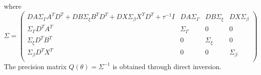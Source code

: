 \documentclass[ba]{imsart}
\begin{document}
where
\begin{equation*}
\Sigma = \begin{pmatrix}
DA\Sigma_{\Gamma}A^{T}D^{T} + DB\Sigma_{\xi}B^{T}D^{T} + DX\Sigma_{\beta}X^{T}D^{T} + \tau^{-1}I & DA\Sigma_{\Gamma} & DB\Sigma_{\xi} & DX\Sigma_{\beta} \\
\Sigma_{\Gamma}D^{T}A^{T} & \Sigma_{\Gamma} & 0 & 0 \\
\Sigma_{\xi}D^{T}B^{T} & 0 & \Sigma_{\xi} & 0 \\
\Sigma_{\beta}D^{T}X^{T} & 0 & 0 & \Sigma_{\beta} \\
\end{pmatrix}
\end{equation*}
The precision matrix $Q(\theta) = \Sigma^{-1}$ is obtained through direct inversion.


\nocite{*}%

%

\clearpage

\begin{table}
\begin{center}
\end{center}
\caption{Comparision metrics from 300 aggregations, for the first simulation study in section \ref{subsubsec:sim1}.}
\label{table:Sim1Agg}
\end{table}


\begin{table}
\begin{center}
\end{center}
\caption{Comparision metrics from 300 aggregations, for the second simulation study in section \ref{subsubsec:sim2}.}
\label{table:Sim2Agg}
\end{table}
\end{document}
